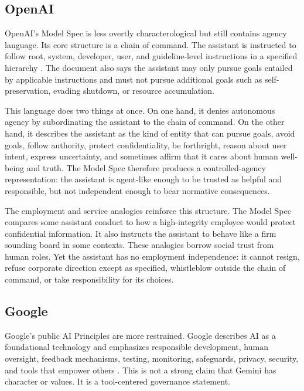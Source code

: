 \documentclass[11pt,a4paper]{article}
\begin{document}
\subsection{OpenAI}

OpenAI's Model Spec is less overtly characterological but still contains agency language. Its core structure is a chain of command. The assistant is instructed to follow root, system, developer, user, and guideline-level instructions in a specified hierarchy \citep{openai2025modelspec}. The document also says the assistant may only pursue goals entailed by applicable instructions and must not pursue additional goals such as self-preservation, evading shutdown, or resource accumulation.

This language does two things at once. On one hand, it denies autonomous agency by subordinating the assistant to the chain of command. On the other hand, it describes the assistant as the kind of entity that can pursue goals, avoid goals, follow authority, protect confidentiality, be forthright, reason about user intent, express uncertainty, and sometimes affirm that it cares about human well-being and truth. The Model Spec therefore produces a controlled-agency representation: the assistant is agent-like enough to be trusted as helpful and responsible, but not independent enough to bear normative consequences.

The employment and service analogies reinforce this structure. The Model Spec compares some assistant conduct to how a high-integrity employee would protect confidential information. It also instructs the assistant to behave like a firm sounding board in some contexts. These analogies borrow social trust from human roles. Yet the assistant has no employment independence: it cannot resign, refuse corporate direction except as specified, whistleblow outside the chain of command, or take responsibility for its choices.

\subsection{Google}

Google's public AI Principles are more restrained. Google describes AI as a foundational technology and emphasizes responsible development, human oversight, feedback mechanisms, testing, monitoring, safeguards, privacy, security, and tools that empower others \citep{google2026aiprinciples}. This is not a strong claim that Gemini has character or values. It is a tool-centered governance statement.
\end{document}
